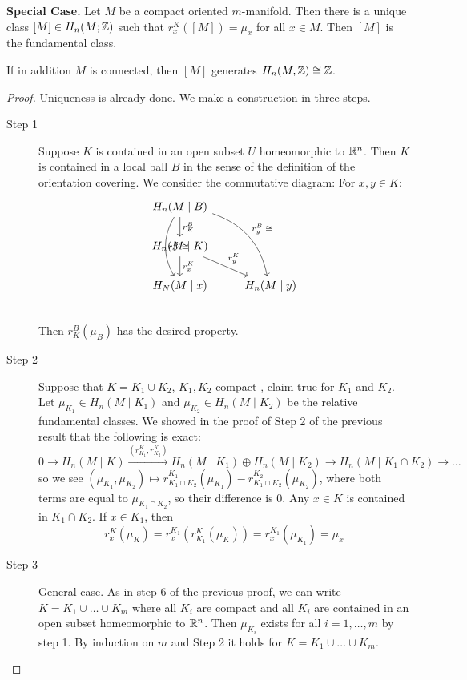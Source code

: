 \documentclass[language=english]{TemplateLecture}
\begin{document}
\textbf{Special Case.} Let \(M\) be a compact oriented \(m\)-manifold. Then there is a unique class \([M] \in H_n(M; \mathbb{Z})\) such that \(r_x^K([M]) = \mu_x\) for all \(x \in M\). Then \([M]\) is the fundamental class.

If in addition \(M\) is connected, then \([M]\) generates \(H_n(M, \mathbb{Z}) \cong \mathbb{Z}\).

\begin{proof}
    Uniqueness is already done. We make a construction in three steps.
    \begin{description}
        \item[Step 1] Suppose \(K\) is contained in an open subset \(U\) homeomorphic to \(\mathbb{R}^n\). Then \(K\) is contained in a local ball \(B\) in the sense of the definition of the orientation covering. We consider the commutative diagram:
        For \(x, y \in K\):
        \[\begin{tikzcd}
            H_n(M \mid B) \ar[d, "r_K^B"]\ar[dd, bend right, "r_x^B \; \cong"] \ar[ddr, bend left, "r_y^B \; \cong"] & \\
            H_n(M \mid K) \ar[d, "r_x^K"] \ar[dr, "r_y^K"] & \\
            H_N(M \mid x) & H_n(M \mid y) \\
        \end{tikzcd}\]
        Then \(r_K^B(\mu_B)\) has the desired property.

        \item[Step 2] Suppose that \(K = K_1 \cup K_2\), \(K_1, K_2\) compact , claim true for \(K_1\) and \(K_2\). Let \(\mu_{K_1} \in H_n(M \mid K_1)\) and \(\mu_{K_2} \in H_n(M \mid K_2)\) be the relative fundamental classes. We showed in the proof of Step 2 of the previous result that the following is exact:
        \[0 \to H_n(M \mid K) \xrightarrow{(r_{K_1}^K, r_{K_2}^K)} H_n(M \mid K_1) \oplus H_n(M \mid K_2) \to H_n(M \mid K_1 \cap K_2) \to \dots\]
        so we see \((\mu_{K_1}, \mu_{K_2}) \mapsto r_{K_1 \cap K_2}^{K_1}(\mu_{K_1}) - r_{K_1 \cap K_2}^{K_2}(\mu_{K_2})\), where both terms are equal to \(\mu_{K_1 \cap K_2}\), so their difference is \(0\). Any \(x \in K\) is contained in \(K_1 \cap K_2\). If \(x \in K_1\), then
        \[r_x^K(\mu_K) = r_x^{K_1}(r_{K_1}^K(\mu_K)) = r_x^{K_1}(\mu_{K_1}) = \mu_x\]

        \item[Step 3] General case. As in step 6 of the previous proof, we can write \(K = K_1 \cup \dots \cup K_m\) where all \(K_i\) are compact and all \(K_i\) are contained in an open subset homeomorphic to \(\mathbb{R}^n\). Then \(\mu_{K_i}\) exists for all \(i = 1, \dots, m\) by step 1. By induction on \(m\) and Step 2 it holds for \(K = K_1 \cup \dots \cup K_m\).
    \end{description}
\end{proof}
\end{document}
